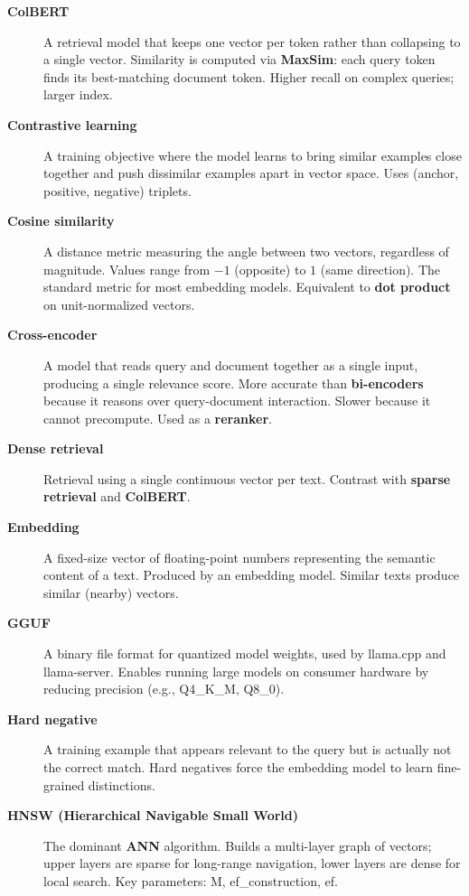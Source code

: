 \begin{description}
\item[\textbf{ColBERT}]
A retrieval model that keeps one vector per token rather than collapsing to a single vector.
Similarity is computed via \textbf{MaxSim}: each query token finds its best-matching document
token. Higher recall on complex queries; larger index.

\item[\textbf{Contrastive learning}]
A training objective where the model learns to bring similar examples close together and push
dissimilar examples apart in vector space. Uses (anchor, positive, negative) triplets.

\item[\textbf{Cosine similarity}]
A distance metric measuring the angle between two vectors, regardless of magnitude. Values
range from $-1$ (opposite) to $1$ (same direction). The standard metric for most embedding
models. Equivalent to \textbf{dot product} on unit-normalized vectors.

\item[\textbf{Cross-encoder}]
A model that reads query and document together as a single input, producing a single relevance
score. More accurate than \textbf{bi-encoders} because it reasons over query-document
interaction. Slower because it cannot precompute. Used as a \textbf{reranker}.

\item[\textbf{Dense retrieval}]
Retrieval using a single continuous vector per text. Contrast with \textbf{sparse retrieval}
and \textbf{ColBERT}.

\item[\textbf{Embedding}]
A fixed-size vector of floating-point numbers representing the semantic content of a text.
Produced by an embedding model. Similar texts produce similar (nearby) vectors.

\item[\textbf{GGUF}]
A binary file format for quantized model weights, used by llama.cpp and llama-server. Enables
running large models on consumer hardware by reducing precision (e.g., Q4\_K\_M, Q8\_0).

\item[\textbf{Hard negative}]
A training example that appears relevant to the query but is actually not the correct match.
Hard negatives force the embedding model to learn fine-grained distinctions.

\item[\textbf{HNSW (Hierarchical Navigable Small World)}]
The dominant \textbf{ANN} algorithm. Builds a multi-layer graph of vectors; upper layers are
sparse for long-range navigation, lower layers are dense for local search. Key parameters:
M, ef\_construction, ef.


\end{description}
